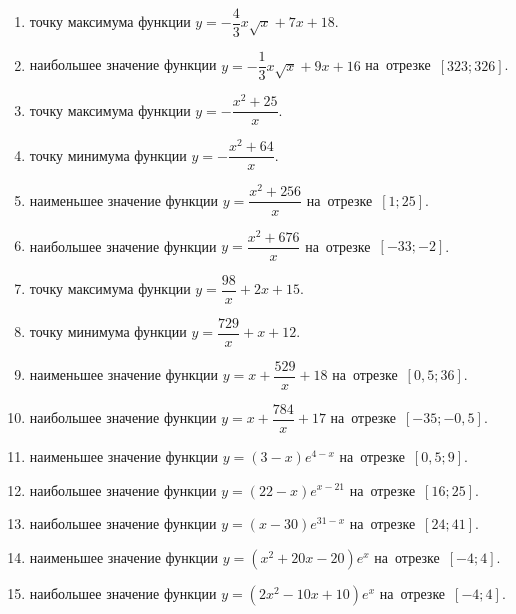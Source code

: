 \documentclass[a4paper,10pt]{article}
\begin{document}
\begin{enumerate}
\item {} точку максимума функции $y=-\dfrac{4}{3}x\sqrt{x} +7x+18$.

\item {} наибольшее значение функции $y=-\dfrac{1}{3}x\sqrt{x} +9x+16$ на~отрезке~$\left[323;326\right]$.

\item {} точку максимума функции $y=-\dfrac{x^2 +25}{x}$.

\item {} точку минимума функции $y=-\dfrac{x^2 +64}{x}$.

\item {} наименьшее значение функции $y=\dfrac{x^2 +256}{x}$ на~отрезке~$\left[1;25\right]$.

\item {} наибольшее значение функции $y=\dfrac{x^2 +676}{x}$ на~отрезке~$\left[-33;-2\right]$.

\item {} точку максимума функции $y=\dfrac{98}{x} +2x+15$.

\item {} точку минимума функции $y=\dfrac{729}{x} +x+12$.

\item {} наименьшее значение функции $y=x+\dfrac{529}{x} +18$ на~отрезке~$\left[0,5;36\right]$.

\item {} наибольшее значение функции $y=x+\dfrac{784}{x} +17$ на~отрезке~$\left[-35;-0,5\right]$.

\item {} наименьшее значение функции $y=\left(3-x\right)e^{4-x}$ на~отрезке~$\left[0,5;9\right]$.

\item {} наибольшее значение функции $y=\left(22-x\right)e^{x-21}$ на~отрезке~$\left[16;25\right]$.

\item {} наибольшее значение функции $y=\left(x-30\right)e^{31-x}$ на~отрезке~$\left[24;41\right]$.

\item {} наименьшее значение функции $y=\left(x^2 +20x -20\right)e^{x }$ на~отрезке~$\left[-4;4\right]$.

\item {} наибольшее значение функции $y=\left(2x^2 -10x +10\right)e^{x}$ на~отрезке~$\left[-4;4\right]$.


\end{enumerate}
\end{document}
